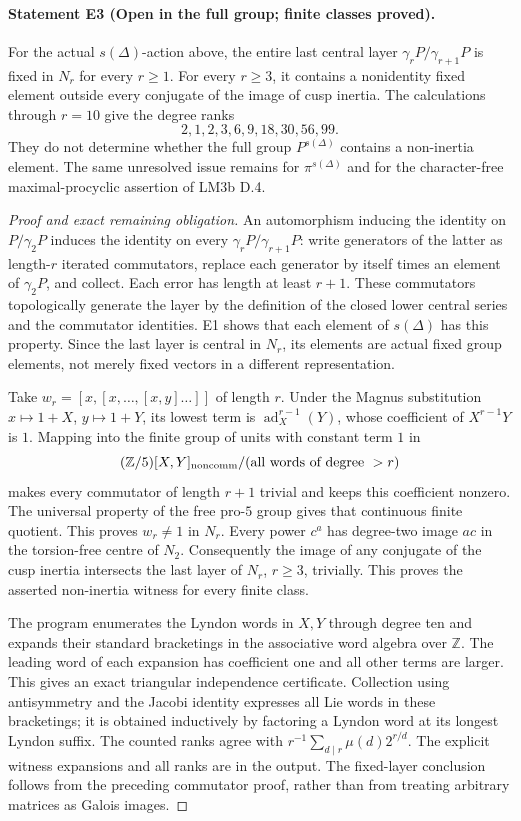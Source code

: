 \paragraph{Statement E3 (Open in the full group; finite classes proved).}\label{res:E3}
For the actual $s(\Delta)$-action above, the entire last central layer $\gamma_rP/\gamma_{r+1}P$ is fixed in $N_r$ for every $r\ge1$. For every $r\ge3$, it contains a nonidentity fixed element outside every conjugate of the image of cusp inertia. The calculations through $r=10$ give the degree ranks
\[
 2,1,2,3,6,9,18,30,56,99.
\]
They do not determine whether the full group $P^{s(\Delta)}$ contains a non-inertia element. The same unresolved issue remains for $\pi^{s(\Delta)}$ and for the character-free maximal-procyclic assertion of LM3b D.4.

\begin{proof}[Proof and exact remaining obligation]
An automorphism inducing the identity on $P/\gamma_2P$ induces the identity on every $\gamma_rP/\gamma_{r+1}P$: write generators of the latter as length-$r$ iterated commutators, replace each generator by itself times an element of $\gamma_2P$, and collect. Each error has length at least $r+1$. These commutators topologically generate the layer by the definition of the closed lower central series and the commutator identities. E1 shows that each element of $s(\Delta)$ has this property. Since the last layer is central in $N_r$, its elements are actual fixed group elements, not merely fixed vectors in a different representation.

Take $w_r=[x,[x,\ldots,[x,y]\ldots]]$ of length $r$. Under the Magnus substitution $x\mapsto1+X$, $y\mapsto1+Y$, its lowest term is $\operatorname{ad}_X^{r-1}(Y)$, whose coefficient of $X^{r-1}Y$ is $1$. Mapping into the finite group of units with constant term $1$ in
\[
 (\mathbb Z/5)[X,Y]_{\rm noncomm}/(\text{all words of degree }>r)
\]
makes every commutator of length $r+1$ trivial and keeps this coefficient nonzero. The universal property of the free pro-$5$ group gives that continuous finite quotient. This proves $w_r\ne1$ in $N_r$. Every power $c^a$ has degree-two image $a c$ in the torsion-free centre of $N_2$. Consequently the image of any conjugate of the cusp inertia intersects the last layer of $N_r$, $r\ge3$, trivially. This proves the asserted non-inertia witness for every finite class.

The program enumerates the Lyndon words in $X,Y$ through degree ten and expands their standard bracketings in the associative word algebra over $\mathbb Z$. The leading word of each expansion has coefficient one and all other terms are larger. This gives an exact triangular independence certificate. Collection using antisymmetry and the Jacobi identity expresses all Lie words in these bracketings; it is obtained inductively by factoring a Lyndon word at its longest Lyndon suffix. The counted ranks agree with $r^{-1}\sum_{d\mid r}\mu(d)2^{r/d}$. The explicit witness expansions and all ranks are in the output. The fixed-layer conclusion follows from the preceding commutator proof, rather than from treating arbitrary matrices as Galois images.


\end{proof}
